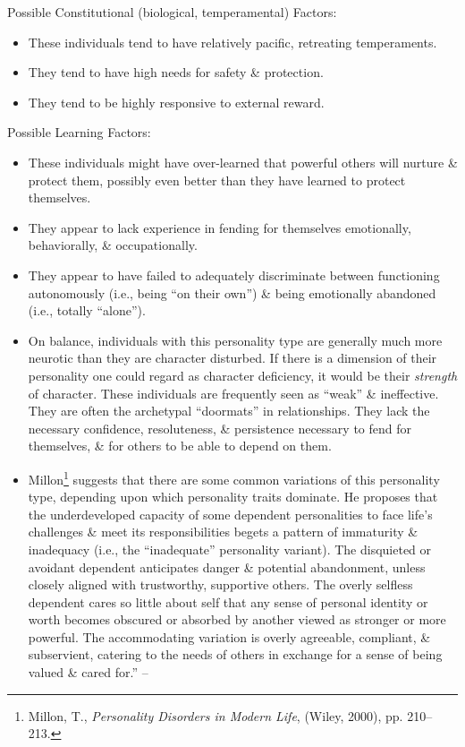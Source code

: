 \documentclass{article}
\numberwithin{equation}{section}
\begin{document}
Possible Constitutional (biological, temperamental) Factors:
\begin{itemize}
	\item These individuals tend to have relatively pacific, retreating temperaments.
	\item They tend to have high needs for safety \& protection.
	\item They tend to be highly responsive to external reward.
\end{itemize}
Possible Learning Factors:
\begin{itemize}
	\item These individuals might have over-learned that powerful others will nurture \& protect them, possibly even better than they have learned to protect themselves.
	\item They appear to lack experience in fending for themselves emotionally, behaviorally, \& occupationally.
	\item They appear to have failed to adequately discriminate between functioning autonomously (i.e., being ``on their own'') \& being emotionally abandoned (i.e., totally ``alone'').
	\item On balance, individuals with this personality type are generally much more neurotic than they are character disturbed. If there is a dimension of their personality one could regard as character deficiency, it would be their \textit{strength} of character. These individuals are frequently seen as ``weak'' \& ineffective. They are often the archetypal ``doormats'' in relationships. They lack the necessary confidence, resoluteness, \& persistence necessary to fend for themselves, \& for others to be able to depend on them.
	\item Millon\footnote{Millon, T., \textit{Personality Disorders in Modern Life}, (Wiley, 2000), pp. 210--213.} suggests that there are some common variations of this personality type, depending upon which personality traits dominate. He proposes that the underdeveloped capacity of some dependent personalities to face life's challenges \& meet its responsibilities begets a pattern of immaturity \& inadequacy (i.e., the ``inadequate'' personality variant). The disquieted or avoidant dependent anticipates danger \& potential abandonment, unless closely aligned with trustworthy, supportive others. The overly selfless dependent cares so little about self that any sense of personal identity or worth becomes obscured or absorbed by another viewed as stronger or more powerful. The accommodating variation is overly agreeable, compliant, \& subservient, catering to the needs of others in exchange for a sense of being valued \& cared for.'' -- \cite[pp. 56--59]{Simon2011}
\end{itemize}
\end{document}
